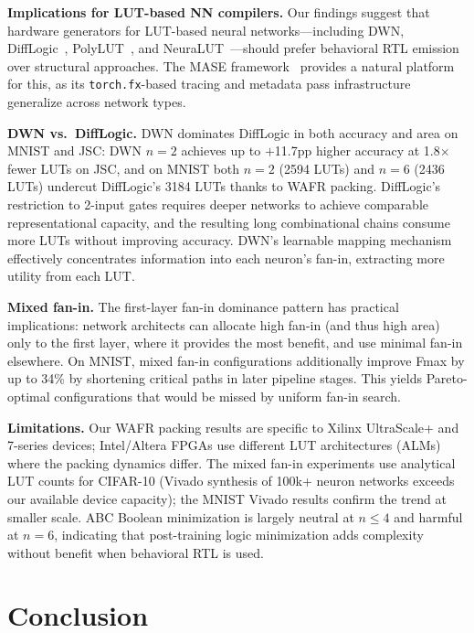 \documentclass[conference]{IEEEtran}
\begin{document}
\textbf{Implications for LUT-based NN compilers.}
Our findings suggest that hardware generators for LUT-based neural networks---including DWN, DiffLogic~\cite{petersen2022difflogic}, PolyLUT~\cite{polylutadd2024}, and NeuraLUT~\cite{wang2024neuralut}---should prefer behavioral RTL emission over structural approaches.
The MASE framework~\cite{mase2024} provides a natural platform for this, as its \texttt{torch.fx}-based tracing and metadata pass infrastructure generalize across network types.

\textbf{DWN vs.\ DiffLogic.}
DWN dominates DiffLogic in both accuracy and area on MNIST and JSC: DWN $n{=}2$ achieves up to $+$11.7pp higher accuracy at 1.8$\times$ fewer LUTs on JSC, and on MNIST both $n{=}2$ (\num{2594} LUTs) and $n{=}6$ (\num{2436} LUTs) undercut DiffLogic's \num{3184} LUTs thanks to WAFR packing.
DiffLogic's restriction to 2-input gates requires deeper networks to achieve comparable representational capacity, and the resulting long combinational chains consume more LUTs without improving accuracy.
DWN's learnable mapping mechanism effectively concentrates information into each neuron's fan-in, extracting more utility from each LUT.

\textbf{Mixed fan-in.}
The first-layer fan-in dominance pattern has practical implications: network architects can allocate high fan-in (and thus high area) only to the first layer, where it provides the most benefit, and use minimal fan-in elsewhere.
On MNIST, mixed fan-in configurations additionally improve Fmax by up to 34\% by shortening critical paths in later pipeline stages.
This yields Pareto-optimal configurations that would be missed by uniform fan-in search.

\textbf{Limitations.}
Our WAFR packing results are specific to Xilinx UltraScale+ and 7-series devices; Intel/Altera FPGAs use different LUT architectures (ALMs) where the packing dynamics differ.
The mixed fan-in experiments use analytical LUT counts for CIFAR-10 (Vivado synthesis of 100k+ neuron networks exceeds our available device capacity); the MNIST Vivado results confirm the trend at smaller scale.
ABC Boolean minimization is largely neutral at $n \leq 4$ and harmful at $n{=}6$, indicating that post-training logic minimization adds complexity without benefit when behavioral RTL is used.


\section{Conclusion}
\label{sec:conclusion}
\end{document}
